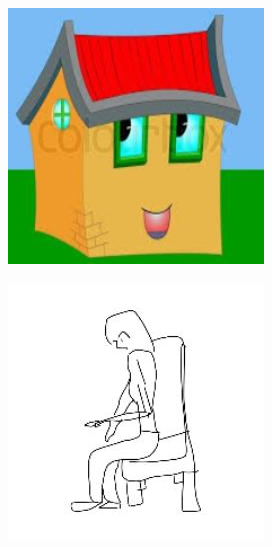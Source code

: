 \documentclass{article}
\begin{document}
\begin{center}
\begin{minipage}{0.142\textwidth}
    \end{minipage}%
    \begin{minipage}{0.142\textwidth}
        \includegraphics[width=\linewidth]{./pic/misclassified_r5_p4_2723.jpg}
    \end{minipage}%
    \begin{minipage}{0.142\textwidth}
        \includegraphics[width=\linewidth]{./pic/misclassified_r6_p0_2723.jpg}

\end{minipage}
\end{center}
\end{document}
